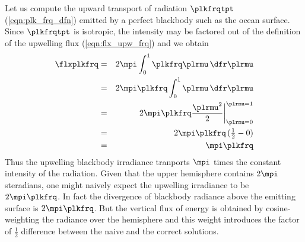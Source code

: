 \documentclass[12pt]{article}
\begin{document}
Let us compute the upward transport of radiation $\plkfrqtpt$
(\ref{eqn:plk_frq_dfn}) emitted by a perfect blackbody such as the
ocean surface.  
Since $\plkfrqtpt$ is isotropic, the intensity may be factored
out of the definition of the upwelling flux (\ref{eqn:flx_upw_frq}) 
and we obtain
\begin{eqnarray} 
\flxplkfrq & = & 2 \mpi \int_{0}^{1} \plkfrq \plrmu \,\dfr\plrmu \nonumber \\
& = & 2 \mpi \plkfrq \int_{0}^{1} \plrmu \,\dfr\plrmu \nonumber \\
& = & 2 \mpi \plkfrq \frac{\plrmu^{2}}{2} \bigg|_{\plrmu = 0}^{\plrmu = 1} \nonumber \\
& = & 2 \mpi \plkfrq \, ({\textstyle\frac{1}{2}} - 0) \nonumber \\
& = & \mpi \plkfrq
\label{eqn:plk_hms_dfn}
\end{eqnarray} 
Thus the upwelling blackbody irradiance tranports $\mpi$ times the
 constant intensity of the radiation. 
Given that the upper hemisphere contains $2\mpi$ steradians, one might
naively expect the upwelling irradiance to be $2\mpi \plkfrq$.
In fact the divergence of blackbody radiance above the emitting
surface is $2\mpi \plkfrq$.
But the vertical flux of energy is obtained by cosine-weighting the
radiance over the hemisphere and this weight introduces the factor of 
$\frac{1}{2}$ difference between the naive and the correct solutions.
\end{document}
